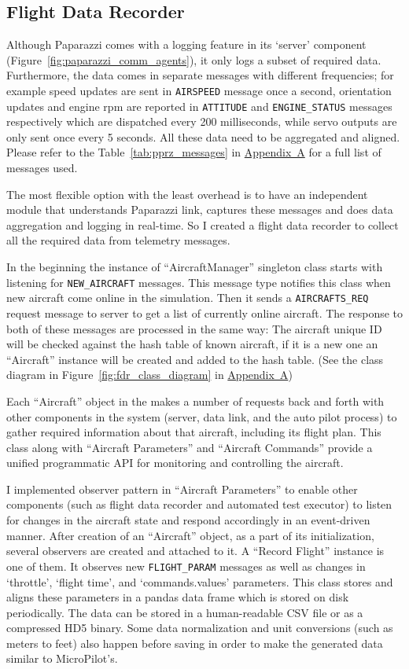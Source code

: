 \subsection{Flight Data Recorder}
Although Paparazzi comes with a logging feature in its `server' component (Figure~\ref{fig:paparazzi_comm_agents}), it only logs a subset of required data. Furthermore, the data comes in separate messages with different frequencies; for example speed updates are sent in \verb|AIRSPEED| message once a second, orientation updates and engine rpm are reported in \verb|ATTITUDE| and \verb|ENGINE_STATUS| messages respectively which are dispatched every 200 milliseconds, while servo outputs are only sent once every 5 seconds. All these data need to be aggregated and aligned. Please refer to the Table~\ref{tab:pprz_messages} in \hyperref[appendixa]{Appendix~A} for a full list of messages used.

The most flexible option with the least overhead is to have an independent module that understands Paparazzi link, captures these messages and does data aggregation and logging in real-time. So I created a flight data recorder to collect all the required data from telemetry messages.

In the beginning the instance of ``AircraftManager'' singleton class starts with listening for \verb|NEW_AIRCRAFT| messages. This message type notifies this class when new aircraft come online in the simulation. Then it sends a \verb|AIRCRAFTS_REQ| request message to server to get a list of currently online aircraft. The response to both of these messages are processed in the same way: The aircraft unique ID will be checked against the hash table of known aircraft, if it is a new one an ``Aircraft'' instance will be created and added to the hash table. (See the class diagram in Figure~\ref{fig:fdr_class_diagram} in \hyperref[appendixa]{Appendix~A})

Each ``Aircraft'' object in the makes a number of requests back and forth with other components in the system (server, data link, and the auto pilot process) to gather required information about that aircraft, including its flight plan. This class along with ``Aircraft Parameters'' and ``Aircraft Commands'' provide a unified programmatic API for monitoring and controlling the aircraft. 

I implemented observer pattern \cite{gamma1995design} in ``Aircraft Parameters'' to enable other components (such as flight data recorder and automated test executor) to listen for changes in the aircraft state and respond accordingly in an event-driven manner. 
After creation of an ``Aircraft'' object, as a part of its initialization, several observers are created and attached to it. A ``Record Flight'' instance is one of them. It observes new \verb|FLIGHT_PARAM| messages as well as changes in `throttle', `flight time', and `commands.values' parameters. This class stores and aligns these parameters in a pandas data frame which is stored on disk periodically. The data can be stored in a human-readable CSV file or as a compressed HD5 binary. Some data normalization and unit conversions (such as meters to feet) also happen before saving in order to make the generated data similar to MicroPilot's.

